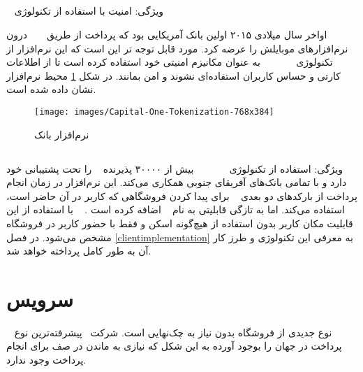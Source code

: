 \documentclass[oneside]{report}
\begin{document}
		\subsection{{\small {}}} 			 									 
		ویژگی: امنیت با استفاده از تکنولوژی 
					 			 				 {\normalsize {}}	
 
 
 اواخر سال میلادی ۲۰۱۵ اولین بانک آمریکایی بود که پرداخت از طریق 
 			 			 				 {\normalsize {}}	
 			 			 				 درون نرم‌افزار‌های موبایلش را عرضه کرد. مورد قابل توجه تر این است که این نرم‌افزار از تکنولوژی 
 			 			 				 			 			 				 {\normalsize {}}
 			 			 				 			 			 				 به عنوان مکانیزم امنیتی خود استفاده کرده است تا از اطلاعات کارتی و حساس کاربران استفاده‌ای نشوند و امن بمانند. در شکل 
 	\ref{fig:capital-one-tokenization-768x384}
 	محیط نرم‌افزار 
 				 {\normalsize {} }
 				نشان داده شده است.		 			 				 			 			 				 
 			 			 				 			 			 				 
 			 			 				 			 			 				 
 \begin{figure}[h]
 	\centering
 	\texttt{[image: images/Capital-One-Tokenization-768x384]}
 	\caption{نرم‌افزار بانک {\footnotesize {}}}
 	\label{fig:capital-one-tokenization-768x384}
 \end{figure}

 			\subsection{{\small {}}}
 			ویژگی: استفاده از تکنولوژی 
 			 			 			 				 {\normalsize {}}	
 			 			 			 			\newline
  			 			 			 				 {\normalsize {}}
  			 			 			 				 بیش از ۳۰۰۰۰ پذیرنده 
  			 			 			 				  را تحت پشتیبانی خود دارد و با تمامی بانک‌های آفریقای جنوبی همکاری می‌کند. این نرم‌افزار  در زمان انجام پرداخت  از بارکد‌های دو بعدی 
برای پیدا کردن فروشگاهی که کاربر در آن حاضر است، استفاده می‌کند. اما به تازگی قابلیتی به نام 
 			 			 			 				 {\normalsize{}} اضافه کرده است . 
 			 			 			 				 با استفاده از این قابلیت مکان کاربر بدون استفاده از هیچ‌گونه اسکن و فقط با حضور کاربر در فروشگاه مشخص می‌شود. در فصل \ref{clientimplementation} به معرفی این تکنولوژی و طرز کار آن به طور کامل پرداخته خواهد شد.
 	
	  \section{   سرویس    {\normalsize {}}  }
 		{\normalsize {}} 		
 	نوع جدیدی از فروشگاه  بدون نیاز به چک‌نهایی
 	است.
شرکت 
 		{\normalsize {}} پیشرفته‌ترین نوع پرداخت در جهان را بوجود آورده به این شکل که نیازی به ماندن در صف برای انجام پرداخت وجود ندارد. 
 	
\end{document}
